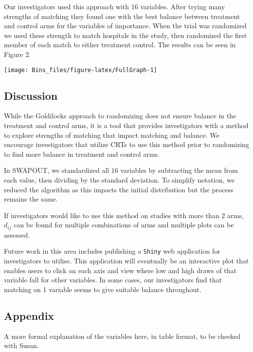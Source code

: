 \documentclass[]{sagej}
\begin{document}
Our investigators used this approach with 16 variables. After trying
many strengths of matching they found one with the best balance between
treatment and control arms for the variables of importance. When the
trial was randomized we used these strength to match hospitals in the
study, then randomized the first member of each match to either
treatment control. The results can be seen in Figure 2.

\begin{center}\texttt{[image: Bins\_files/figure-latex/FullGraph-1]} \end{center}

\subsection{Discussion}\label{discussion}

While the Goldilocks approach to randomizing does not ensure balance in
the treatment and control arms, it is a tool that provides investigators
with a method to explore strengths of matching that impact matching and
balance. We encourage investigators that utilize CRTs to use this method
prior to randomizing to find more balance in treatment and control arms.

In SWAPOUT, we standardized all \(16\) variables by subtracting the mean
from each value, then dividing by the standard deviation. To simplify
notation, we reduced the algorithm as this impacts the initial
distribution but the process remains the same.

If investigators would like to use this method on studies with more than
\(2\) arms, \(d_{ij}\) can be found for multiple combinations of arms
and multiple plots can be assessed.

Future work in this area includes publishing a \texttt{Shiny} web
application for investigators to utilise. This application will
eventually be an interactive plot that enables users to click on each
axis and view where low and high draws of that variable fall for other
variables. In some cases, our investigators find that matching on 1
variable seems to give suitable balance throughout.

\subsection{Appendix}\label{appendix}

A more formal explanation of the variables here, in table format, to be
checked with Susan.
\end{document}
